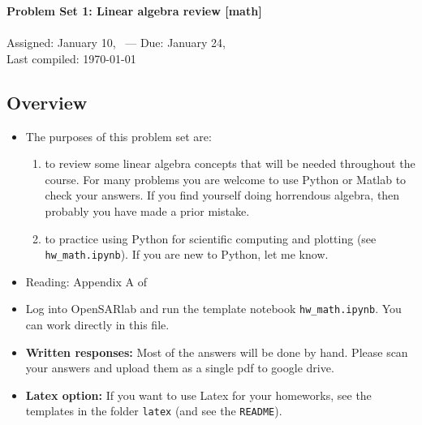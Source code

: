 \documentclass[11pt,titlepage,fleqn]{article}
\begin{document}

\begin{spacing}{1.2}
\centering
{\large \bf Problem Set 1: Linear algebra review [math]} \\
\cltag\ \\
Assigned: January 10, \cyear\ --- Due: January 24, \cyear\ \\
Last compiled: \today
\end{spacing}


\subsection*{Overview}

\begin{itemize}

\item The purposes of this problem set are:
%
\begin{enumerate}
\item  to review some linear algebra concepts that will be needed throughout the course.
For many problems you are welcome to use Python or Matlab to check your answers. If you find yourself doing horrendous algebra, then probably you have made a prior mistake.
\item to practice using Python for scientific computing and plotting (see \verb+hw_math.ipynb+).
If you are new to Python, let me know.
\end{enumerate}

\item Reading: Appendix A of \citet{Aster}

\item Log into OpenSARlab and run the template notebook \verb+hw_math.ipynb+. You can work directly in this file.

\item {\bf Written responses:}
Most of the answers will be done by hand. Please scan your answers and upload them as a single pdf to google drive.

\item {\bf Latex option:}
If you want to use Latex for your homeworks, see the templates in the folder \verb+latex+ (and see the \verb+README+).

\end{itemize}
\end{document}
